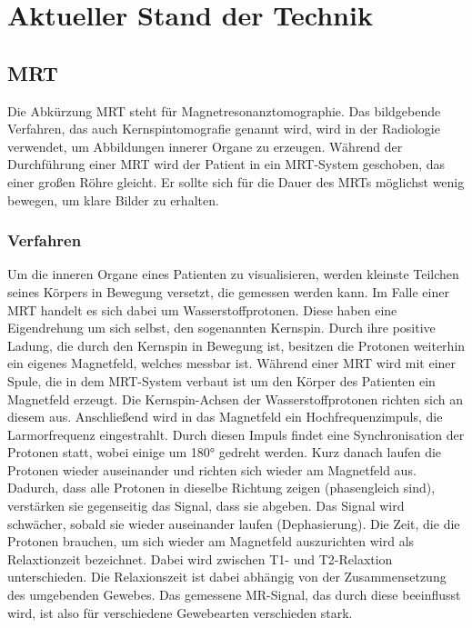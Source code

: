 
\chapter{Aktueller Stand der Technik}

\section{MRT}												 %

Die Abkürzung MRT steht für Magnetresonanztomographie. Das bildgebende Verfahren, das auch Kernspintomografie genannt wird, wird in der Radiologie verwendet, um Abbildungen innerer Organe zu erzeugen. Während der Durchführung einer MRT wird der Patient in ein MRT-System geschoben, das einer großen Röhre gleicht. Er sollte sich für die Dauer des MRTs möglichst wenig bewegen, um klare Bilder zu erhalten.
 	
\subsection{Verfahren}

Um die inneren Organe eines Patienten zu visualisieren, werden kleinste Teilchen seines Körpers in Bewegung versetzt, die gemessen werden kann. Im Falle einer MRT handelt es sich dabei um Wasserstoffprotonen. Diese haben eine Eigendrehung um sich selbst, den sogenannten Kernspin. Durch ihre positive Ladung, die durch den Kernspin in Bewegung ist, besitzen die Protonen weiterhin ein eigenes Magnetfeld, welches messbar ist. 
Während einer MRT wird mit einer Spule, die in dem MRT-System verbaut ist um den Körper des Patienten ein Magnetfeld erzeugt. Die Kernspin-Achsen der Wasserstoffprotonen richten sich an diesem aus. Anschließend wird in das Magnetfeld ein Hochfrequenzimpuls, die Larmorfrequenz eingestrahlt. Durch diesen Impuls findet eine Synchronisation der Protonen statt, wobei einige um 180° gedreht werden. Kurz danach laufen die Protonen wieder auseinander und richten sich wieder am Magnetfeld aus. 
Dadurch, dass alle Protonen in dieselbe Richtung zeigen (phasengleich sind), verstärken sie gegenseitig das Signal, dass sie abgeben. Das Signal wird schwächer, sobald sie wieder auseinander laufen (Dephasierung).
Die Zeit, die die Protonen brauchen, um sich wieder am Magnetfeld auszurichten wird als Relaxtionzeit bezeichnet. Dabei wird zwischen T1- und T2-Relaxtion unterschieden.
Die Relaxionszeit ist dabei abhängig von der Zusammensetzung des umgebenden Gewebes. Das gemessene MR-Signal, das durch diese beeinflusst wird, ist also für verschiedene Gewebearten verschieden stark.

